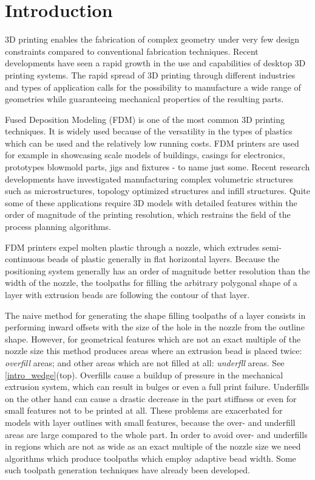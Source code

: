 \section{Introduction}
3D printing enables the fabrication of complex geometry under very few design constraints compared to conventional fabrication techniques.
Recent developments have seen a rapid growth in the use and capabilities of desktop 3D printing systems.
The rapid spread of 3D printing through different industries and types of application calls for the possibility to manufacture a wide range of geometries while guaranteeing mechanical properties of the resulting parts.

Fused Deposition Modeling (FDM) is one of the most common 3D printing techniques.
It is widely used because of the versatility in the types of plastics which can be used and the relatively low running costs.
FDM printers are used for example in showcasing scale models of buildings, casings for electronics, prototypes blowmold parts, jigs and fixtures - to name just some.
Recent research developments have investigated manufacturing complex volumetric structures such as microstructures, topology optimized structures and infill structures.
Quite some of these applications require 3D models with detailed features within the order of magnitude of the printing resolution, which restrains the field of the process planning algorithms.

FDM printers expel molten plastic through a nozzle, which extrudes semi-continuous beads of plastic generally in flat horizontal layers.
Because the positioning system generally has an order of magnitude better resolution than the width of the nozzle,
the toolpaths for filling the arbitrary polygonal shape of a layer with extrusion beads are following the contour of that layer.

The naive method for generating the shape filling toolpaths of a layer consists in performing inward offsets with the size of the hole in the nozzle from the outline shape.
However, for geometrical features which are not an exact multiple of the nozzle size this method produces areas where an extrusion bead is placed twice: \emph{overfill} areas; and other areas which are not filled at all: \emph{underfll} areas.
See \cref{intro_wedge}(top).
Overfills cause a buildup of pressure in the mechanical extrusion system, which can result in bulges or even a full print failure.
Underfills on the other hand can cause a drastic decrease in the part stiffness or even for small features not to be printed at all.
These problems are exacerbated for models with layer outlines with small features, because the over- and underfill areas are large compared to the whole part.
In order to avoid over- and underfills in regions which are not as wide as an exact multiple of the nozzle size we need algorithms which produce toolpaths which employ adaptive bead width.
Some such toolpath generation techniques have already been developed.

